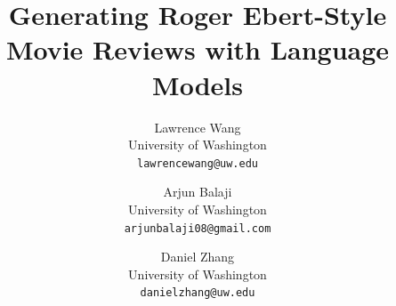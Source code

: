\documentclass[10pt,twocolumn,letterpaper]{article}
\title{Generating Roger Ebert-Style Movie Reviews with Language Models}
\author{
Lawrence Wang\\
University of Washington\\
{\tt\small lawrencewang@uw.edu}
\and
Arjun Balaji\\
University of Washington\\
{\tt\small arjunbalaji08@gmail.com}
\and
Daniel Zhang\\
University of Washington\\
{\tt\small danielzhang@uw.edu}
}
\begin{document}
\maketitle







{
    \small
    
    
}

% 
\end{document}

